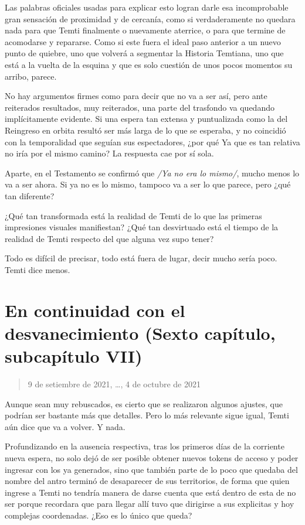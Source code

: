 \documentclass[
  spanish,
]{book}
\begin{document}
Las palabras oficiales usadas para explicar esto logran darle esa incomprobable gran sensación de proximidad y de cercanía, como si verdaderamente no quedara nada para que Temti finalmente o nuevamente aterrice, o para que termine de acomodarse y repararse. Como si este fuera el ideal paso anterior a un nuevo punto de quiebre, uno que volverá a segmentar la Historia Temtiana, uno que está a la vuelta de la esquina y que es solo cuestión de unos pocos momentos su arribo, parece.

No hay argumentos firmes como para decir que no va a ser así, pero ante reiterados resultados, muy reiterados, una parte del trasfondo va quedando implícitamente evidente. Si una espera tan extensa y puntualizada como la del Reingreso en orbita resultó ser más larga de lo que se esperaba, y no coincidió con la temporalidad que seguían sus espectadores, ¿por qué Ya que es tan relativa no iría por el mismo camino? La respuesta cae por sí sola.

Aparte, en el Testamento se confirmó que \emph{/Ya no era lo mismo/}, mucho menos lo va a ser ahora. Si ya no es lo mismo, tampoco va a ser lo que parece, pero ¿qué tan diferente?

¿Qué tan transformada está la realidad de Temti de lo que las primeras impresiones visuales manifiestan? ¿Qué tan desvirtuado está el tiempo de la realidad de Temti respecto del que alguna vez supo tener?

Todo es difícil de precisar, todo está fuera de lugar, decir mucho sería poco. Temti dice menos.

\hypertarget{en-continuidad-con-el-desvanecimiento-sexto-capuxedtulo-subcapuxedtulo-vii}{%
\section{En continuidad con el desvanecimiento (Sexto capítulo, subcapítulo VII)}\label{en-continuidad-con-el-desvanecimiento-sexto-capuxedtulo-subcapuxedtulo-vii}}

\begin{quote}
9 de setiembre de 2021, \ldots, 4 de octubre de 2021
\end{quote}

Aunque sean muy rebuscados, es cierto que se realizaron algunos ajustes, que podrían ser bastante más que detalles. Pero lo más relevante sigue igual, Temti aún dice que va a volver. Y nada.

Profundizando en la ausencia respectiva, tras los primeros días de la corriente nueva espera, no solo dejó de ser posible obtener nuevos tokens de acceso y poder ingresar con los ya generados, sino que también parte de lo poco que quedaba del nombre del antro terminó de desaparecer de sus territorios, de forma que quien ingrese a Temti no tendría manera de darse cuenta que está dentro de esta de no ser porque recordara que para llegar allí tuvo que dirigirse a sus explicitas y hoy complejas coordenadas. ¿Eso es lo único que queda?
\end{document}
